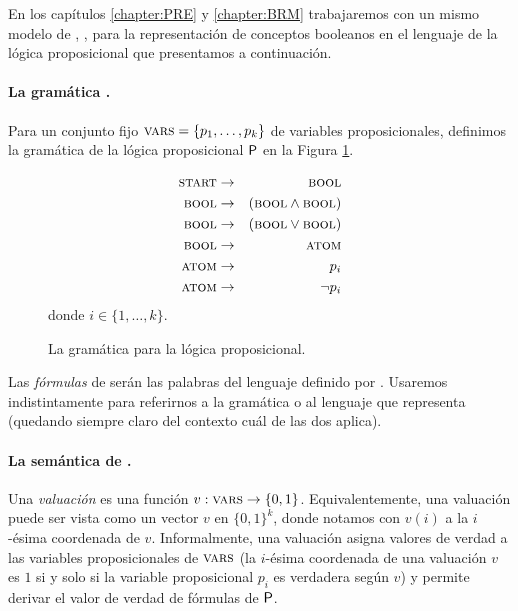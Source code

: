 
En los capítulos \ref{chapter:PRE} y \ref{chapter:BRM} trabajaremos con un mismo modelo de \lot, \grambool, para la representación de conceptos booleanos en el lenguaje de la lógica proposicional que presentamos a continuación.

\paragraph{La gramática \grambool.}
Para un conjunto fijo $\textsc{vars}=\{p_1,\dots,p_k\}$ de variables proposicionales, definimos la gramática de la lógica proposicional ${\sf P}$ en la Figura \ref{fig:grambool}.
%
\renewcommand{\thefigure}{PII.1}
\begin{figure}[h!]
\begin{eqnarray*}
\textsc{start} &\to&\textsc{bool}\\
\textsc{bool} &\to&(\textsc{bool} \wedge \textsc{bool}) \\
\textsc{bool} &\to&(\textsc{bool} \vee \textsc{bool}) \\
\textsc{bool} &\to&\textsc{atom}\\
\textsc{atom} &\to& p_i \\
\textsc{atom} &\to&\lnot p_i 
\end{eqnarray*}
donde $i\in\{1,\dots,k\}$.
\caption{La gramática \grambool para la lógica proposicional.}
\label{fig:grambool}
\end{figure}
%
Las {\em fórmulas} de \grambool serán las palabras del lenguaje definido por \grambool. Usaremos indistintamente \grambool para referirnos a la gramática o al lenguaje que representa (quedando siempre claro del contexto cuál de las dos aplica).


\paragraph{La semántica de \grambool.}
Una {\em valuación} es una función $v:\textsc{vars}\to\{0,1\}$. Equivalentemente, una valuación puede ser vista como un vector $v$ en $\{0,1\}^k$, donde notamos con $v(i)$ a la $i$-ésima coordenada de $v$. Informalmente, una valuación asigna valores de verdad a las variables proposicionales de $\textsc{vars}$ (la $i$-ésima coordenada de una valuación $v$ es $1$ si y solo si la variable proposicional $p_i$ es verdadera según $v$) y permite derivar el valor de verdad de fórmulas de ${\sf P}$.  

